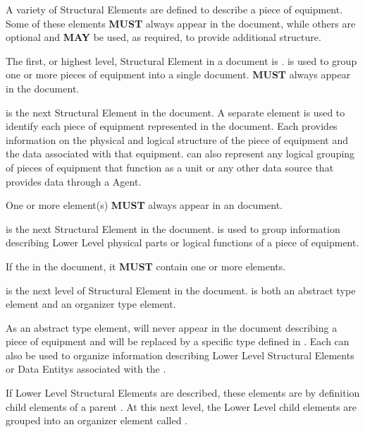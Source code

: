 \FloatBarrier


A variety of \glspl{Structural Element} are defined to describe a piece of equipment.  Some of these elements \textbf{MUST} always appear in the  document, while others are optional and \textbf{MAY} be used, as required, to provide additional structure.

The first, or highest level, \gls{Structural Element} in a  document is .  is used to group one or more pieces of equipment into a single document.   \textbf{MUST} always appear in the  document.

 is the next \gls{Structural Element} in the  document. A separate  element is used to identify each piece of equipment represented in the  document. Each  provides information on the physical and logical structure of the piece of equipment and the data associated with that equipment.  can also represent any logical grouping of pieces of equipment that function as a unit or any other data source that provides data through a \gls{Agent}.

One or more  element(s) \textbf{MUST} always appear in an  document.

 is the next \gls{Structural Element} in the  document.  is used to group information describing \gls{Lower Level} physical parts or logical functions of a piece of equipment.

If the  in the document, it \textbf{MUST} contain one or more  elements.

 is the next level of \gls{Structural Element} in the  document.  is both an abstract type element and an \gls{organizer} type element. 

As an abstract type element,  will never appear in the document describing a piece of equipment and will be replaced by a specific  type defined in . Each  can also be used to organize information describing \gls{Lower Level} \glspl{Structural Element} or \glspl{Data Entity} associated with the .

If \gls{Lower Level} \glspl{Structural Element} are described, these elements are by definition child  elements of a parent . At this next level, the \gls{Lower Level} child  elements are grouped into an \gls{organizer} element called .
 
